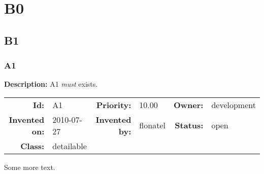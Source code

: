 \chapter{B0}
\section{B1}
\subsection{A1}\label{A1}
\textbf{Description:} A1 \textsl{must} exists.

\par
{\small \begin{center}\begin{tabular}{rlrlrl}
\textbf{Id:} & A1  & \textbf{Priority:} & 10.00  & \textbf{Owner:} & development\\ 
\textbf{Invented on:} & 2010-07-27  & \textbf{Invented by:} & flonatel  & \textbf{Status:} & open \\ 
\textbf{Class:} & detailable  & & & \end{tabular}\end{center} }

Some more text.
